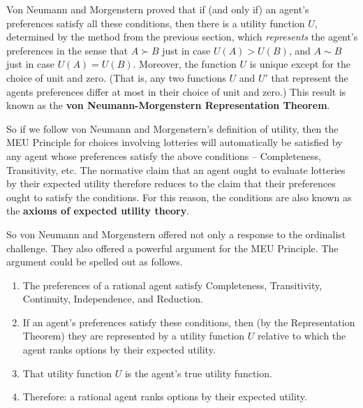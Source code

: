 Von Neumann and Morgenstern proved that if (and only if) an agent's
preferences satisfy all these conditions, then there is a utility
function $U$, determined by the method from the previous section,
which \emph{represents} the agent's preferences in the sense that
$A \succ B$ just in case $U(A) > U(B)$, and $A \sim B$ just in case
$U(A) = U(B)$. Moreover, the function $U$ is unique except for the
choice of unit and zero. (That is, any two functions $U$ and $U'$ that
represent the agents preferences differ at most in their choice of
unit and zero.) This result is known as the \textbf{von
  Neumann-Morgenstern Representation Theorem}.


So if we follow von Neumann and Morgenstern's definition of utility, then the
MEU Principle for choices involving lotteries will automatically be satisfied by
any agent whose preferences satisfy the above conditions -- Completeness,
Transitivity, etc. The normative claim that an agent ought to evaluate lotteries
by their expected utility therefore reduces to the claim that their preferences
ought to satisfy the conditions. For this reason, the conditions are also known
as the \textbf{axioms of expected utility theory}.

So von Neumann and Morgenstern offered not only a response to the
ordinalist challenge. They  also offered a powerful argument for the MEU Principle. The
argument could be spelled out as follows.

\begin{enumerate}
  \itemsep0em
\item The preferences of a rational agent satisfy Completeness,
  Transitivity, Continuity, Independence, and Reduction.
\item If an agent's preferences satisfy these conditions, then (by the
  Representation Theorem) they are represented by a utility function
  $U$ relative to which the agent ranks options by their expected utility.
\item That utility function $U$ is the agent's true utility function.
\item Therefore: a rational agent ranks options by their expected utility.
\end{enumerate}

